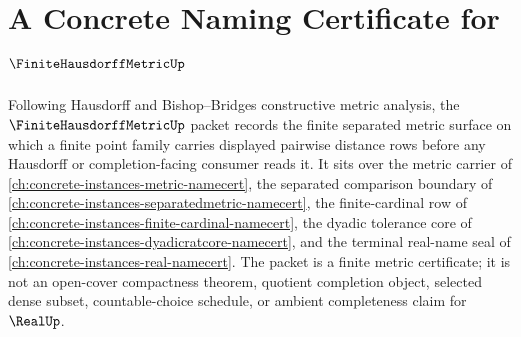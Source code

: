 \chapter{A Concrete Naming Certificate for $\FiniteHausdorffMetricUp$}
\label{ch:concrete-instances-finite-hausdorff-metric-namecert}

Following Hausdorff and Bishop--Bridges constructive metric analysis, the $\FiniteHausdorffMetricUp$ packet records the finite separated metric surface on which a finite point family carries displayed pairwise distance rows before any Hausdorff or completion-facing consumer reads it. It sits over the metric carrier of \autoref{ch:concrete-instances-metric-namecert}, the separated comparison boundary of \autoref{ch:concrete-instances-separatedmetric-namecert}, the finite-cardinal row of \autoref{ch:concrete-instances-finite-cardinal-namecert}, the dyadic tolerance core of \autoref{ch:concrete-instances-dyadicratcore-namecert}, and the terminal real-name seal of \autoref{ch:concrete-instances-real-namecert}. The packet is a finite metric certificate; it is not an open-cover compactness theorem, quotient completion object, selected dense subset, countable-choice schedule, or ambient completeness claim for $\RealUp$.


